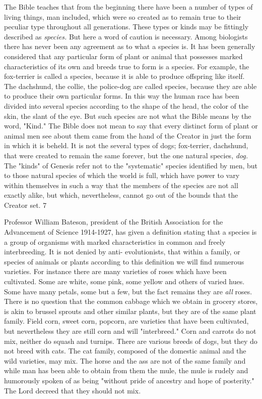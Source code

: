 The Bible teaches that from the beginning there have been a number of types of living things,
man included, which were so created as to remain true to their peculiar type throughout all
generations. These types or kinds may be fittingly described as \textit{species.} But here a word of
caution is necessary. Among biologists there has never been any agreement as to what a
species is. It has been generally considered that any particular form of plant or animal that
possesses marked characteristics of its own and breeds true to form is a species. For example,
the fox-terrier is called a species, because it is able to produce offspring like itself. The
dachshund, the collie, the police-dog are called species, because they are able to produce
their own particular forms. In this way the human race has been divided into several species
according to the shape of the head, the color of the skin, the slant of the eye. But such species
are not what the Bible means by the word, "Kind." The Bible does not mean to say that every
distinct form of plant or animal men see about them came from the hand of the Creator in just
the form in which it is beheld. It is not the several types of dogs; fox-terrier, dachshund, that
were created to remain the same forever, but the one natural species, \textit{dog.} The "kinds" of
Genesis refer not to the "systematic" species identified by men, but to those natural species of
which the world is full, which have power to vary within themselves in such a way that the
members of the species are not all exactly alike, but which, nevertheless, cannot go out of the
bounds that the Creator set. 7

Professor William Bateson, president of the British Association for the Advancement of
Science 1914-1927, has given a definition stating that a species is a group of organisms with
marked characteristics in common and freely interbreeding. It is not denied by anti-
evolutionists, that within a family, or species of animals or plants according to this definition
we will find numerous varieties. For instance there are many varieties of roses which have
been cultivated. Some are white, some pink, some yellow and others of varied hues. Some
have many petals, some but a few, but the fact remains they are \textit{all} roses. There is no
question that the common cabbage which we obtain in grocery stores, is akin to brussel
sprouts and other similar plants, but they are of the same plant family. Field corn, sweet corn,
popcorn, are varieties that have been cultivated, but nevertheless they are still corn and will
"interbreed." Corn and carrots do not mix, neither do squash and turnips. There are various
breeds of dogs, but they do not breed with cats. The cat family, composed of the domestic
animal and the wild varieties, may mix. The horse and the ass are not of the same family and
while man has been able to obtain from them the mule, the mule is rudely and humorously
spoken of as being "without pride of ancestry and hope of posterity." The Lord decreed that
they should not mix.

